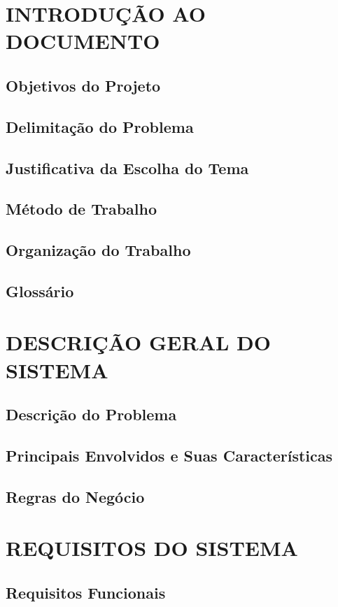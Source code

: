 \section{INTRODUÇÃO AO DOCUMENTO}

\subsection{Objetivos do Projeto}
\subsection{Delimitação do Problema}
\subsection{Justificativa da Escolha do Tema}
\subsection{Método de Trabalho}
\subsection{Organização do Trabalho}
\subsection{Glossário}

\section{DESCRIÇÃO GERAL DO SISTEMA}

\subsection{Descrição do Problema}
\subsection{Principais Envolvidos e Suas Características}
\subsection{Regras do Negócio}

\section{REQUISITOS DO SISTEMA}
\subsection{Requisitos Funcionais}
